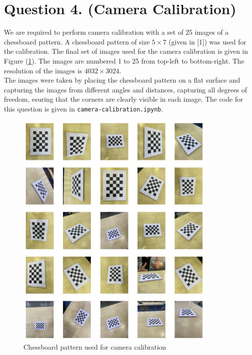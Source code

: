 \documentclass[10pt]{article}
\newcommand{\figref}[1]{Figure (\ref{fig:#1})}
\begin{document}
    \section*{\textbf{Question 4. (Camera Calibration)}}
    We are required to perform camera calibration with a set of 25 images of
    a chessboard pattern. A chessboard pattern of size $5 \times 7$ (given in
    [1]) was used for the calibration. The final set of images used for the
    camera calibration is given in \figref{final-image-set}. The images
    are numbered 1 to 25 from top-left to bottom-right. The resolution of the
    images is $4032 \times 3024$. \\
    The images were taken by placing the chessboard pattern on a flat surface
    and capturing the images from different angles and distances, capturing all
    degrees of freedom, esuring that the corners are clearly visible in each image.
    The code for this question is given in \texttt{camera-calibration.ipynb}.
    \begin{figure}[htbp]
        \begin{center}
            \includegraphics[width=0.875\textwidth]{Assets/Question-4/final-image-set.png}
            \caption{Chessboard pattern used for camera calibration}
            \label{fig:final-image-set}
        \end{center}
    \end{figure}
\end{document}
